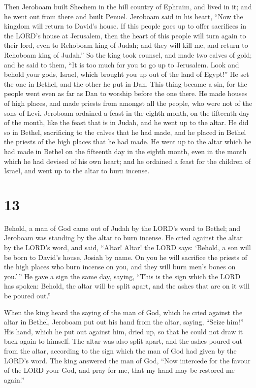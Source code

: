  Then Jeroboam built Shechem in the hill country of
Ephraim, and lived in it; and he went out from there and built Penuel.
 Jeroboam said in his heart, ``Now the kingdom will return
to David's house.  If this people goes up to offer
sacrifices in the LORD's house at Jerusalem, then the heart of this
people will turn again to their lord, even to Rehoboam king of Judah;
and they will kill me, and return to Rehoboam king of Judah.''
 So the king took counsel, and made two calves of gold; and
he said to them, ``It is too much for you to go up to Jerusalem. Look
and behold your gods, Israel, which brought you up out of the land of
Egypt!''  He set the one in Bethel, and the other he put in
Dan.  This thing became a sin, for the people went even as
far as Dan to worship before the one there.  He made houses
of high places, and made priests from amongst all the people, who were
not of the sons of Levi.  Jeroboam ordained a feast in the
eighth month, on the fifteenth day of the month, like the feast that is
in Judah, and he went up to the altar. He did so in Bethel, sacrificing
to the calves that he had made, and he placed in Bethel the priests of
the high places that he had made.  He went up to the altar
which he had made in Bethel on the fifteenth day in the eighth month,
even in the month which he had devised of his own heart; and he ordained
a feast for the children of Israel, and went up to the altar to burn
incense.

\hypertarget{section-12}{%
\section{13}\label{section-12}}

 Behold, a man of God came out of Judah by the LORD's word
to Bethel; and Jeroboam was standing by the altar to burn incense.
 He cried against the altar by the LORD's word, and said,
``Altar! Altar! the LORD says: `Behold, a son will be born to David's
house, Josiah by name. On you he will sacrifice the priests of the high
places who burn incense on you, and they will burn men's bones on
you.'\,''  He gave a sign the same day, saying, ``This is
the sign which the LORD has spoken: Behold, the altar will be split
apart, and the ashes that are on it will be poured out.''

 When the king heard the saying of the man of God, which he
cried against the altar in Bethel, Jeroboam put out his hand from the
altar, saying, ``Seize him!'' His hand, which he put out against him,
dried up, so that he could not draw it back again to himself.
 The altar was also split apart, and the ashes poured out
from the altar, according to the sign which the man of God had given by
the LORD's word.  The king answered the man of God, ``Now
intercede for the favour of the LORD your God, and pray for me, that my
hand may be restored me again.''

